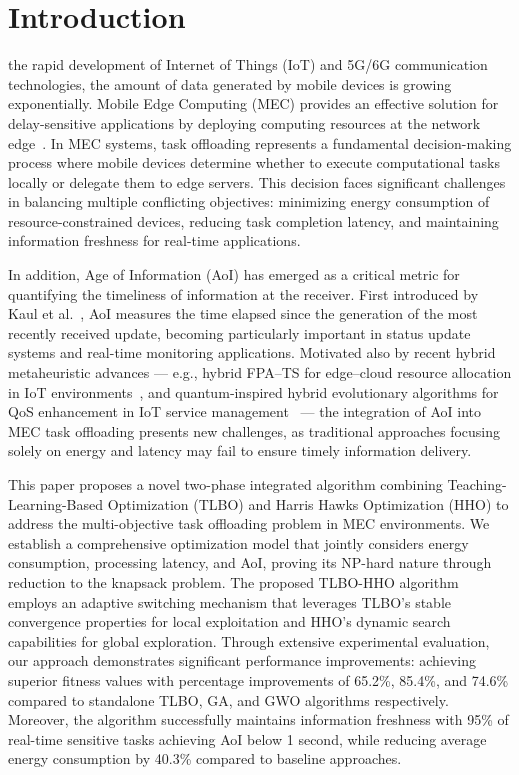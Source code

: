 \documentclass[conference]{IEEEtran}
\begin{document}
\section{Introduction}
 the rapid development of Internet of Things (IoT) and 5G/6G communication technologies, the amount of data generated by mobile devices is growing exponentially. Mobile Edge Computing (MEC) provides an effective solution for delay-sensitive applications by deploying computing resources at the network edge~\cite{mao2017survey}. In MEC systems, task offloading represents a fundamental decision-making process where mobile devices determine whether to execute computational tasks locally or delegate them to edge servers. This decision faces significant challenges in balancing multiple conflicting objectives: minimizing energy consumption of resource-constrained devices, reducing task completion latency, and maintaining information freshness for real-time applications.

In addition, Age of Information (AoI) has emerged as a critical metric for quantifying the timeliness of information at the receiver. First introduced by Kaul et al.~\cite{kaul2012real}, AoI measures the time elapsed since the generation of the most recently received update, becoming particularly important in status update systems and real-time monitoring applications. Motivated also by recent hybrid metaheuristic advances — e.g., hybrid FPA–TS for edge–cloud resource allocation in IoT environments~\cite{Dankolo_2025}, and quantum‑inspired hybrid evolutionary algorithms for QoS enhancement in IoT service management~\cite{Singh_2025} — the integration of AoI into MEC task offloading presents new challenges, as traditional approaches focusing solely on energy and latency may fail to ensure timely information delivery.

This paper proposes a novel two-phase integrated algorithm combining Teaching-Learning-Based Optimization (TLBO) and Harris Hawks Optimization (HHO) to address the multi-objective task offloading problem in MEC environments. We establish a comprehensive optimization model that jointly considers energy consumption, processing latency, and AoI, proving its NP-hard nature through reduction to the knapsack problem. The proposed TLBO-HHO algorithm employs an adaptive switching mechanism that leverages TLBO's stable convergence properties for local exploitation and HHO's dynamic search capabilities for global exploration. Through extensive experimental evaluation, our approach demonstrates significant performance improvements: achieving superior fitness values with percentage improvements of 65.2\%, 85.4\%, and 74.6\% compared to standalone TLBO, GA, and GWO algorithms respectively. Moreover, the algorithm successfully maintains information freshness with 95\% of real-time sensitive tasks achieving AoI below 1 second, while reducing average energy consumption by 40.3\% compared to baseline approaches.
\end{document}
